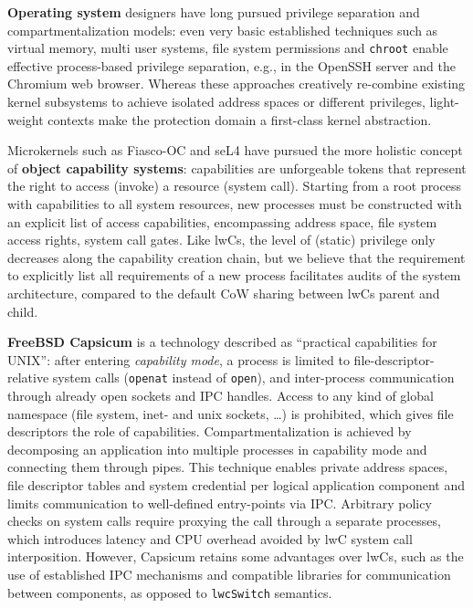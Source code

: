 \documentclass[10pt,twocolumn,a4paper]{article}
\begin{document}
\textbf{Operating system} designers have long pursued privilege separation and compartmentalization models:
even very basic established techniques such as virtual memory, multi user systems, file system permissions and \lstinline{chroot} enable effective process-based privilege separation, e.g., in the OpenSSH server and the Chromium web browser.
Whereas these approaches creatively re-combine existing kernel subsystems to achieve isolated address spaces or different privileges, light-weight contexts make the protection domain a first-class kernel abstraction.
\cite{provos2003preventing, barth2008security}

Microkernels such as Fiasco-OC and seL4 have pursued the more holistic concept of \textbf{object capability systems}:
capabilities are unforgeable tokens that represent the right to access (invoke) a resource (system call).
Starting from a root process with capabilities to all system resources, new processes must be constructed with an explicit list of access capabilities, encompassing address space, file system access rights, system call gates.
Like lwCs, the level of (static) privilege only decreases along the capability creation chain, but we believe that the requirement to explicitly list all requirements of a new process facilitates audits of the system architecture, compared to the default CoW sharing between lwCs parent and child.
\cite{elphinstone2013l3}

\textbf{FreeBSD Capsicum} is a technology described as \enquote{practical capabilities for UNIX}:
after entering \textit{capability mode}, a process is limited to file-descriptor-relative system calls (\lstinline{openat} instead of \lstinline{open}), and inter-process communication through already open sockets and IPC handles.
Access to any kind of global namespace (file system, inet- and unix sockets, \dots) is prohibited, which gives file descriptors the role of capabilities.
Compartmentalization is achieved by decomposing an application into multiple processes in capability mode and connecting them through pipes.
This technique enables private address spaces, file descriptor tables and system credential per logical application component and limits communication to well-defined entry-points via IPC.
Arbitrary policy checks on system calls require proxying the call through a separate processes, which introduces latency and CPU overhead avoided by lwC system call interposition.
However, Capsicum retains some advantages over lwCs, such as the use of established IPC mechanisms and compatible libraries for communication between components, as opposed to \lstinline{lwcSwitch} semantics.
\cite{watson2010capsicum}
\end{document}
